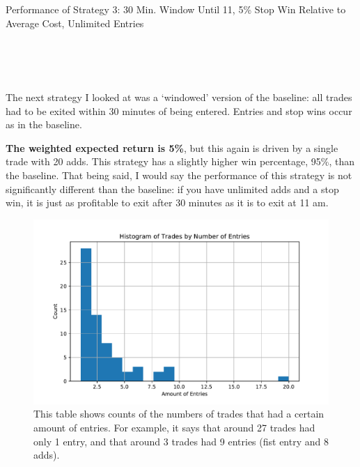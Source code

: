 \documentclass{article}
\begin{document}
\begin{table}
\caption{Performance of Strategy 3: 30 Min. Window Until 11, 5\% Stop Win Relative to Average Cost, Unlimited Entries}
\\[2ex]


\\[2ex]


\\[2ex]

\label{tab_strat_3}
\end{table}

The next strategy I looked at was a `windowed' version of the baseline: all trades had to be exited within 30 minutes of being entered. Entries and stop wins occur as in the baseline. 

\textbf{The weighted expected return is 5\%}, but this again is driven by a single trade with 20 adds. This strategy has a slightly higher win percentage, 95\%, than the baseline. That being said, I would say the performance of this strategy is not significantly different than the baseline: if you have unlimited adds and a stop win, it is just as profitable to exit after 30 minutes as it is to exit at 11 am. 

\begin{figure}
	\includegraphics[width=\textwidth]{prog_entry_w30_stop_win_hist.pdf}
	\caption{This table shows counts of the numbers of trades that had a certain amount of entries. For example, it says that around 27 trades had only 1 entry, and that around 3 trades had 9 entries (fist entry and 8 adds).}
	\label{hist_strat_3}
	\end{figure}
\end{document}
